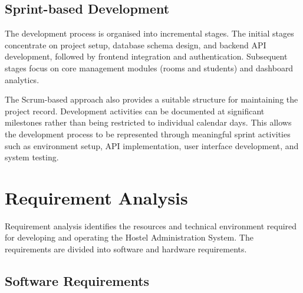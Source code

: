 \begin{center}
\end{center}

\subsection{Sprint-based Development}

The development process is organised into incremental stages. The initial stages concentrate on project setup, database schema design, and backend API development, followed by frontend integration and authentication. Subsequent stages focus on core management modules (rooms and students) and dashboard analytics.

The Scrum-based approach also provides a suitable structure for maintaining the project record. Development activities can be documented at significant milestones rather than being restricted to individual calendar days. This allows the development process to be represented through meaningful sprint activities such as environment setup, API implementation, user interface development, and system testing.

\section{Requirement Analysis}

Requirement analysis identifies the resources and technical environment required for developing and operating the Hostel Administration System. The requirements are divided into software and hardware requirements.

\subsection{Software Requirements}

